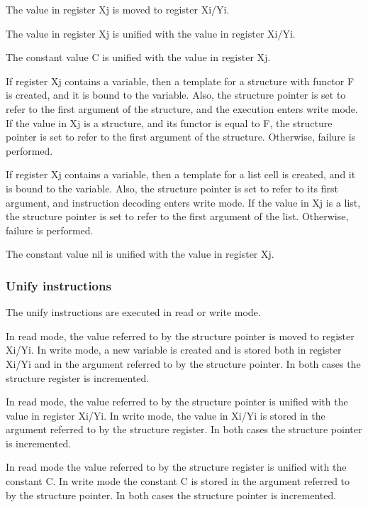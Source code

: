 The value in register Xj is moved to register Xi/Yi. 

The value in register Xj is unified with the value in register
Xi/Yi. 

The constant value C is unified with the value in register Xj.

If register Xj contains a variable, then a template for a
structure with functor F is created, and it is bound to the
variable.  Also, the structure pointer is set to refer to the first
argument of the structure, and the execution enters write mode.  If the
value in Xj is a structure, and its functor is equal to F, the
structure pointer is set to refer to the first argument of the
structure.  Otherwise, failure is performed.

If register Xj contains a variable, then a template for a list
cell is created, and it is bound to the variable.  Also, the structure
pointer is set to refer to its first argument, and instruction
decoding enters write mode.  If the value in Xj is a list, the
structure pointer is set to refer to the first argument of the list.
Otherwise, failure is performed.

The constant value nil is unified with the value in register Xj.

\subsubsection{Unify instructions}

The unify instructions are executed in read or write mode. 

In read mode, the value referred to by the structure pointer is
moved to register Xi/Yi.  In write mode, a new variable is
created and is stored both in register Xi/Yi and in the argument
referred to by the structure pointer.  In both cases the structure
register is incremented.

In read mode, the value referred to by the structure pointer is
unified with the value in register Xi/Yi.  In write mode, the
value in Xi/Yi is stored in the argument referred to by the structure
register.  In both cases the structure pointer is incremented.

In read mode the value referred to by the structure register is
unified with the constant C. In write mode the constant C is stored in
the argument referred to by the structure pointer. In both cases the
structure pointer is incremented.

